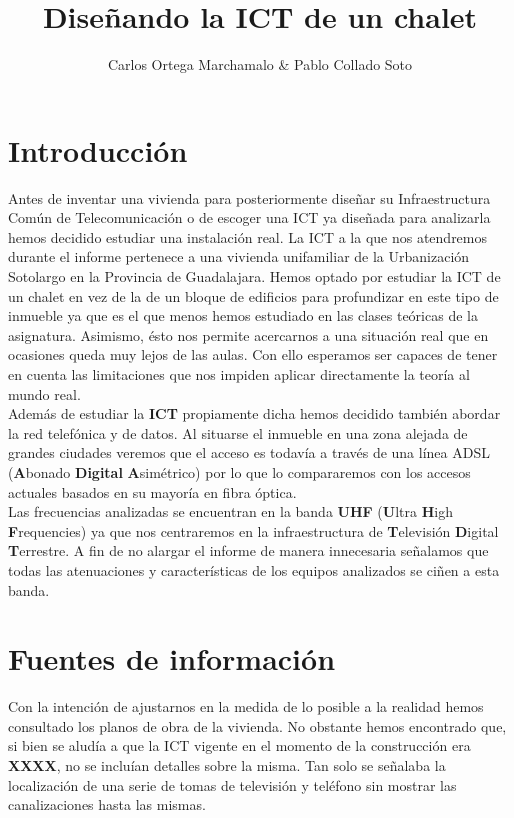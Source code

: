 \documentclass{article}[12 pt]
\title{Diseñando la ICT de un chalet}
\author{Carlos Ortega Marchamalo \& Pablo Collado Soto}
\date{}
\begin{document}
	\maketitle

	\section{Introducción}
		Antes de inventar una vivienda para posteriormente diseñar su Infraestructura Común de Telecomunicación o de escoger una ICT ya diseñada para analizarla hemos decidido estudiar una instalación real. La ICT a la que nos atendremos durante el informe pertenece a una vivienda unifamiliar de la Urbanización Sotolargo en la Provincia de Guadalajara. Hemos optado por estudiar la ICT de un chalet en vez de la de un bloque de edificios para profundizar en este tipo de inmueble ya que es el que menos hemos estudiado en las clases teóricas de la asignatura. Asimismo, ésto nos permite acercarnos a una situación real que en ocasiones queda muy lejos de las aulas. Con ello esperamos ser capaces de tener en cuenta las limitaciones que nos impiden aplicar directamente la teoría al mundo real.\\

		Además de estudiar la \textbf{ICT} propiamente dicha hemos decidido también abordar la red telefónica y de datos. Al situarse el inmueble en una zona alejada de grandes ciudades veremos que el acceso es todavía a través de una línea ADSL (\textbf{A}bonado \textbf{Digital} \textbf{A}simétrico) por lo que lo compararemos con los accesos actuales basados en su mayoría en fibra óptica.\\

		Las frecuencias analizadas se encuentran en la banda \textbf{UHF} (\textbf{U}ltra \textbf{H}igh \textbf{F}requencies) ya que nos centraremos en la infraestructura de \textbf{T}elevisión \textbf{D}igital \textbf{T}errestre. A fin de no alargar el informe de manera innecesaria señalamos que todas las atenuaciones y características de los equipos analizados se ciñen a esta banda.\\

	\section{Fuentes de información}
		Con la intención de ajustarnos en la medida de lo posible a la realidad hemos consultado los planos de obra de la vivienda. No obstante hemos encontrado que, si bien se aludía a que la ICT vigente en el momento de la construcción era \textbf{XXXX}, no se incluían detalles sobre la misma. Tan solo se señalaba la localización de una serie de tomas de televisión y teléfono sin mostrar las canalizaciones hasta las mismas.\\
\end{document}
